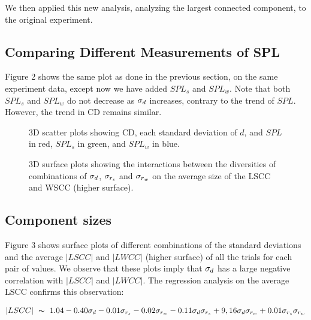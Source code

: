 We then applied this new analysis, analyzing the largest
connected component, to the original experiment.

\subsection{Comparing Different Measurements of SPL}

Figure 2 shows the same plot as done in the previous section, on the
same experiment data, except now
we have added $SPL_s$ and $SPL_w$.
Note that both $SPL_s$ and $SPL_w$ do not decrease as $\sd$ increases,
contrary to the trend of $SPL$.
However, the trend in CD remains similar.

\begin{figure*}[hbt!]\centering

    \caption{3D scatter plots showing CD, each
    standard deviation of $d$, and $SPL$ in red,
    $SPL_s$ in green, and $SPL_w$ in blue.}
    \label{fig:scwcSPL}
\end{figure*}


\begin{figure}[hbt!]\centering
    \par

    \hfill

    \caption{3D surface plots showing the interactions between the diversities
    of combinations of $\sd$, $\ss$ and $\sw$ on the average size of the
    LSCC and WSCC (higher surface).}
    \label{stdscc}
\end{figure}
\subsection{Component sizes}
Figure 3 shows surface plots of different combinations of the standard deviations
and the average $|LSCC|$ and $|LWCC|$ (higher surface) of all the trials for each pair of values.
We observe that these plots imply that $\sd$ has a large negative correlation
with $|LSCC|$ and $|LWCC|$.
The regression analysis on the average LSCC confirms this observation:

\begin{gather}
    |LSCC| ~ \thicksim ~ 1.04 - 0.40\sd - 0.01\ss - 0.02\sw -
                0.11\ds + 9,16\dw + 0.01\ssw \label{three}
\end{gather}

